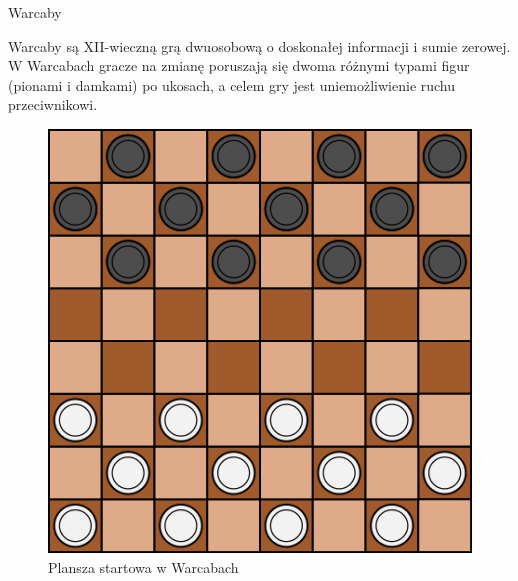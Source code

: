 \begin{frame}{Warcaby}

	Warcaby są XII-wieczną grą dwuosobową o doskonałej informacji i sumie zerowej.
	W Warcabach gracze na zmianę poruszają się dwoma różnymi typami figur (pionami i damkami) po ukosach, a celem gry jest uniemożliwienie ruchu przeciwnikowi.

	\begin{figure}
		\includegraphics[scale=.4]{figures/warcaby_planszaStartowa.png}
		\caption{Plansza startowa w Warcabach}
	\end{figure}

\end{frame}
